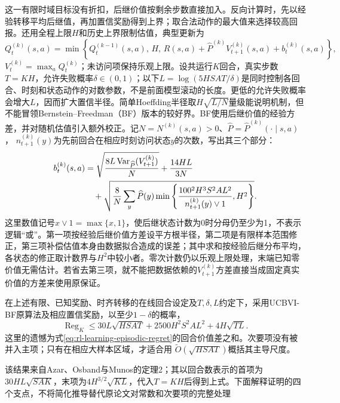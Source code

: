 这一有限时域目标没有折扣，后继价值按剩余步数直接加入。反向计算时，先以经验转移平均后继值，再加置信奖励得到上界；取合法动作的最大值来选择较高回报。还用全程上限$H$和历史上界限制估值，典型更新为
\[
 Q_t^{(k)}(s,a)
   =\min\left\{Q_t^{(k-1)}(s,a),\,H,\,
       R(s,a)+\widehat P^{(k)}V_{t+1}^{(k)}(s,a)
                         +b_t^{(k)}(s,a)\right\},
\]
$V_t^{(k)}=\max_aQ_t^{(k)}$；未访问项保持乐观上限。设共运行$K$回合，真实步数$T=KH$，允许失败概率$\delta\in(0,1)$；以下$L=\log(5HSAT/\delta)$是同时控制各回合、时刻和状态动作的对数参数，不是前面模型滚动的长度。更低的允许失败概率会增大$L$，因而扩大置信半径。简单Hoeffding半径取$H\sqrt{L/N}$量级能说明机制，但不能冒领Bernstein--Freedman（BF）版本的较好界。BF使用后继价值的经验方差，并对随机估值引入额外校正。记$N=N^{(k)}(s,a)>0$、$\widehat P=\widehat P^{(k)}(\cdot\mid s,a)$，
$n_{t+1}^{(k)}(y)$为先前回合在相应时刻访问状态$y$的次数，写出其三个部分：
\begin{align}
 b_t^{(k)}(s,a)
  &=\sqrt{\frac{8L\operatorname{Var}_{\widehat P}
                                  (V_{t+1}^{(k)})}{N}}
       +\frac{14HL}{3N}\notag\\
  &\quad+\sqrt{\frac{8}{N}\sum_y\widehat P(y)
         \min\left\{
           \frac{100^2H^3S^2AL^2}{n_{t+1}^{(k)}(y)\vee1},H^2
                  \right\}} .
 \label{eq:rl-learning-ucbvi-bonus}
\end{align}
这里数值记号$x\vee1=\max\{x,1\}$，使后继状态计数为0时分母仍至少为1，不表示逻辑“或”。第一项按经验后继价值方差设平方根半径，第二项是有限样本范围修正，第三项补偿估值本身由数据拟合造成的误差；其中求和按经验后继分布平均，各状态的修正取计数界与$H^2$中较小者。零次计数仍以乐观上限处理，末端已知零价值无需估计。若省去第三项，就不能把数据依赖的$V_{t+1}^{(k)}$方差直接当成固定真实价值的方差来使用原保证。

\begin{theorem}
  \label{thm:rl-learning-ucbvi}
  在上述有限、已知奖励、时齐转移的在线回合设定及$T,\delta,L$约定下，采用UCBVI-BF原算法及相应置信奖励，以至少$1-\delta$的概率，
  \begin{equation}
    \operatorname{Reg}_K
      \leq30L\sqrt{HSAT}
          +2500H^2S^2AL^2
          +4H\sqrt{TL}.
    \label{eq:rl-learning-ucbvi-bound}
  \end{equation}
  这里的遗憾为式\eqref{eq:rl-learning-episodic-regret}的回合价值差之和。次要项没有被并入主项；只有在相应大样本区域，才适合用
  $\widetilde O(\sqrt{HSAT})$概括其主导尺度。
\end{theorem}

该结果来自Azar、Osband与Munos的定理2；其以回合数表示的首项为$30HL\sqrt{SAK}$，末项为$4H^{3/2}\sqrt{KL}$，代入$T=KH$后得到上式。下面解释证明的四个支点，不将简化推导替代原论文对常数和次要项的完整处理

